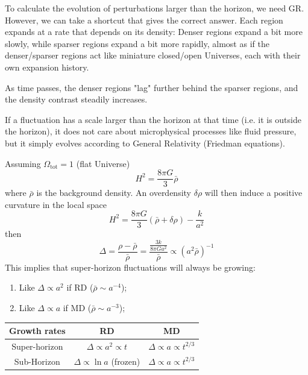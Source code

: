 \par To calculate the evolution of perturbations larger than the horizon, we need GR. However, we can take a shortcut that gives the correct answer. Each region expands at a rate that depends on its density: Denser regions expand a bit more slowly, while sparser regions expand a bit more rapidly, almost as if the denser/sparser regions act like miniature closed/open Universes, each with their own expansion history.
\par As time passes, the denser regions "lag" further behind the sparser regions, and the density contrast steadily increases.
\par If a fluctuation has a scale larger than the horizon at that time (i.e. it is outside the horizon), it does not care about microphysical processes like fluid pressure, but it simply evolves according to General Relativity (Friedman equations).
\par Assuming $\Omega_{\text{tot}} = 1$ (flat Universe)
\begin{equation*}
    H^{2} = \frac{8\pi G}{3}\bar{\rho}
\end{equation*}
where $\bar{\rho}$ is the background density. An overdensity $\delta\rho$ will then induce a positive curvature in the local space 
\begin{equation*}
    H^{2} = \frac{8\pi G}{3}(\bar{\rho}+\delta\rho)-\frac{k}{a^{2}}
\end{equation*}
then 
\begin{equation*}
    \Delta = \frac{\rho -\bar{\rho}}{\bar{\rho}} = \frac{\frac{3k}{8\pi Ga^{2}}}{\bar{\rho}} \propto (a^{2}\bar{\rho})^{-1}
\end{equation*}
This implies that super-horizon fluctuations will always be growing:
\begin{enumerate}
    \item Like $\Delta \propto a^{2}$ if RD ($\bar{\rho}\sim a^{-4}$);
    \item Like $\Delta \propto a$ if MD ($\bar{\rho}\sim a^{-3}$);
\end{enumerate}
\begin{table}[h!]
    \centering
    \begin{tabular}{c|c|c}
        Growth rates & RD & MD \\
        \hline
        Super-horizon & $\Delta \propto a^{2}\propto t$ & $\Delta \propto a\propto t^{2/3}$\\
        Sub-Horizon & $\Delta \propto \ln a$ (frozen) & $\Delta \propto a \propto t^{2/3}$\\
    \end{tabular}
\end{table}
